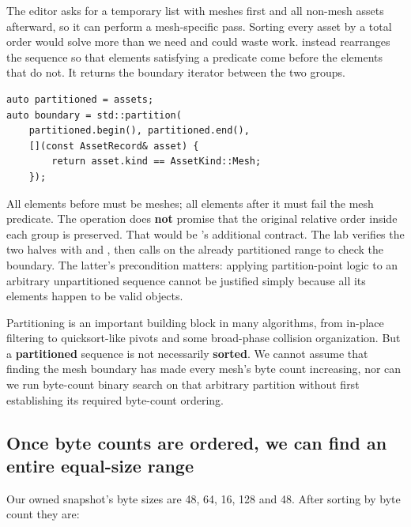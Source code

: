 The editor asks for a temporary list with meshes first and all non-mesh assets afterward, so it can perform a mesh-specific pass. Sorting every asset by a total order would solve more than we need and could waste work.  instead rearranges the sequence so that elements satisfying a predicate come before the elements that do not. It returns the boundary iterator between the two groups.

\begin{verbatim}
auto partitioned = assets;
auto boundary = std::partition(
    partitioned.begin(), partitioned.end(),
    [](const AssetRecord& asset) {
        return asset.kind == AssetKind::Mesh;
    });
\end{verbatim}

All elements before  must be meshes; all elements after it must fail the mesh predicate. The operation does \textbf{not} promise that the original relative order inside each group is preserved. That would be 's additional contract. The lab verifies the two halves with  and , then calls  on the already partitioned range to check the boundary. The latter's precondition matters: applying partition-point logic to an arbitrary unpartitioned sequence cannot be justified simply because all its elements happen to be valid objects.

Partitioning is an important building block in many algorithms, from in-place filtering to quicksort-like pivots and some broad-phase collision organization. But a \textbf{partitioned} sequence is not necessarily \textbf{sorted}. We cannot assume that finding the mesh boundary has made every mesh's byte count increasing, nor can we run byte-count binary search on that arbitrary partition without first establishing its required byte-count ordering.

\subsection{Once byte counts are ordered, we can find an entire equal-size range}\label{05-engine-i-ch006-once-byte-counts-are-ordered-we-can-find-an-entire-equal-size-range}

\hypertarget{05-engine-i-ch006-once-byte-counts-are-ordered-we-can-find-an-entire-equal-size-range}{}

Our owned snapshot's byte sizes are 48, 64, 16, 128 and 48. After sorting by byte count they are:

